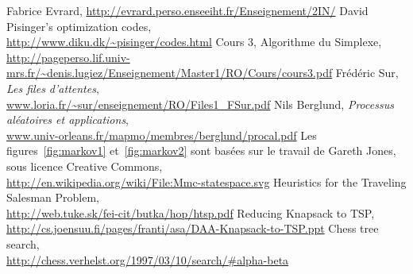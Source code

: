   Fabrice Evrard, \url{http://evrard.perso.enseeiht.fr/Enseignement/2IN/}
  David Pisinger's optimization codes,\\
  \url{http://www.diku.dk/~pisinger/codes.html}
   Cours 3, Algorithme du Simplexe,\\
   \url{http://pageperso.lif.univ-mrs.fr/~denis.lugiez/Enseignement/Master1/RO/Cours/cours3.pdf}
  Frédéric Sur, \emph{Les files d'attentes}, \\
  \url{www.loria.fr/~sur/enseignement/RO/Files1_FSur.pdf}
  Nils Berglund, \emph{Processus aléatoires et applications}, \\
  \url{www.univ-orleans.fr/mapmo/membres/berglund/procal.pdf}
  Les figures~\ref{fig:markov1} et~\ref{fig:markov2} sont basées sur le travail
  de Gareth Jones, sous licence Creative Commons,\\
  \url{http://en.wikipedia.org/wiki/File:Mmc-statespace.svg}
   Heuristics for the Traveling Salesman Problem,\\
   \url{http://web.tuke.sk/fei-cit/butka/hop/htsp.pdf}
   Reducing Knapsack to TSP,\\
   \url{http://cs.joensuu.fi/pages/franti/asa/DAA-Knapsack-to-TSP.ppt}
   Chess tree search, \\
   \url{http://chess.verhelst.org/1997/03/10/search/#alpha-beta}

